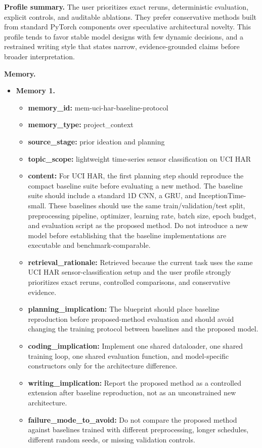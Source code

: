 \documentclass{opendatalab}
\begin{document}
\begin{tcolorbox}
\textbf{Profile summary.}\;
The user prioritizes exact reruns, deterministic evaluation, explicit controls, and auditable ablations. They prefer conservative methods built from standard PyTorch components over speculative architectural novelty. This profile tends to favor stable model designs with few dynamic decisions, and a restrained writing style that states narrow, evidence-grounded claims before broader interpretation.

\medskip
\textbf{Memory.}
\begin{itemize}\setlength\itemsep{2pt}
  \item \textbf{Memory 1.}
  \begin{itemize}\setlength\itemsep{1pt}
    \item \textbf{memory\_id:} mem-uci-har-baseline-protocol
    \item \textbf{memory\_type:} project\_context
    \item \textbf{source\_stage:} prior ideation and planning
    \item \textbf{topic\_scope:} lightweight time-series sensor classification on UCI HAR
    \item \textbf{content:} For UCI HAR, the first planning step should reproduce the compact baseline suite before evaluating a new method. The baseline suite should include a standard 1D CNN, a GRU, and InceptionTime-small. These baselines should use the same train/validation/test split, preprocessing pipeline, optimizer, learning rate, batch size, epoch budget, and evaluation script as the proposed method. Do not introduce a new model before establishing that the baseline implementations are executable and benchmark-comparable.
    \item \textbf{retrieval\_rationale:} Retrieved because the current task uses the same UCI HAR sensor-classification setup and the user profile strongly prioritizes exact reruns, controlled comparisons, and conservative evidence.
    \item \textbf{planning\_implication:} The blueprint should place baseline reproduction before proposed-method evaluation and should avoid changing the training protocol between baselines and the proposed model.
    \item \textbf{coding\_implication:} Implement one shared dataloader, one shared training loop, one shared evaluation function, and model-specific constructors only for the architecture difference.
    \item \textbf{writing\_implication:} Report the proposed method as a controlled extension after baseline reproduction, not as an unconstrained new architecture.
    \item \textbf{failure\_mode\_to\_avoid:} Do not compare the proposed method against baselines trained with different preprocessing, longer schedules, different random seeds, or missing validation controls.
  \end{itemize}


\end{itemize}
\end{tcolorbox}
\end{document}
